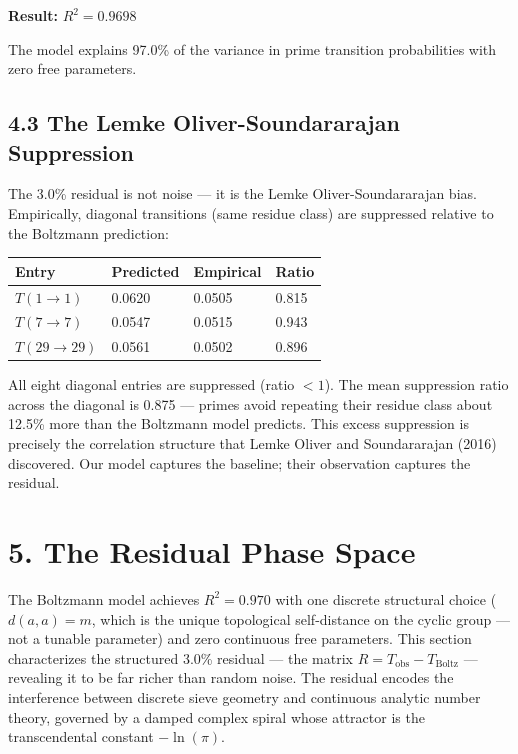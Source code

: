 \documentclass[
  11pt,
]{article}
\newcounter{none} %
\numberwithin{equation}{section}
\begin{document}
\textbf{Result:} \(R^2 = 0.9698\)

The model explains 97.0\% of the variance in prime transition
probabilities with zero free parameters.

\subsection{4.3 The Lemke Oliver-Soundararajan
Suppression}\label{the-lemke-oliver-soundararajan-suppression}

The 3.0\% residual is not noise --- it is the Lemke Oliver-Soundararajan
bias. Empirically, diagonal transitions (same residue class) are
suppressed relative to the Boltzmann prediction:

{\def\LTcaptype{none} %
\begin{longtable}[]{@{}llll@{}}
\toprule\noalign{}
Entry & Predicted & Empirical & Ratio \\
\midrule\noalign{}
\endhead
\bottomrule\noalign{}
\endlastfoot
\(T(1 \to 1)\) & 0.0620 & 0.0505 & 0.815 \\
\(T(7 \to 7)\) & 0.0547 & 0.0515 & 0.943 \\
\(T(29 \to 29)\) & 0.0561 & 0.0502 & 0.896 \\
\end{longtable}
}

All eight diagonal entries are suppressed (ratio \(< 1\)). The mean
suppression ratio across the diagonal is 0.875 --- primes avoid
repeating their residue class about 12.5\% more than the Boltzmann model
predicts. This excess suppression is precisely the correlation structure
that Lemke Oliver and Soundararajan (2016) discovered. Our model
captures the baseline; their observation captures the residual.



\setcounter{section}{5}\setcounter{equation}{0}
\setcounter{section}{5}\setcounter{equation}{0}
\section{5. The Residual Phase Space}\label{the-residual-phase-space}

The Boltzmann model achieves \(R^2 = 0.970\) with one discrete
structural choice (\(d(a,a) = m\), which is the unique topological
self-distance on the cyclic group --- not a tunable parameter) and zero
continuous free parameters. This section characterizes the structured
3.0\% residual --- the matrix \(R = T_{\text{obs}} - T_{\text{Boltz}}\)
--- revealing it to be far richer than random noise. The residual
encodes the interference between discrete sieve geometry and continuous
analytic number theory, governed by a damped complex spiral whose
attractor is the transcendental constant \(-\ln(\pi)\).
\end{document}
